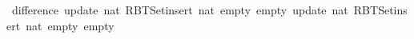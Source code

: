 \begin{isabellebody}
\isamarkupfalse%
\ {\isachardoublequoteopen}difference\ {\isacharparenleft}{\kern0pt}update\ {\isacharparenleft}{\kern0pt}{}{\isacharcolon}{\kern0pt}{\isacharcolon}{\kern0pt}nat{\isacharparenright}{\kern0pt}\ {\isacharparenleft}{\kern0pt}RBT{\isacharunderscore}{\kern0pt}Set{\isachardot}{\kern0pt}insert\ {\isacharparenleft}{\kern0pt}{}{\isacharcolon}{\kern0pt}{\isacharcolon}{\kern0pt}nat{\isacharparenright}{\kern0pt}\ empty{\isacharparenright}{\kern0pt}\ empty{\isacharparenright}{\kern0pt}\ {\isacharparenleft}{\kern0pt}update\ {\isacharparenleft}{\kern0pt}{}{\isacharcolon}{\kern0pt}{\isacharcolon}{\kern0pt}nat{\isacharparenright}{\kern0pt}\ {\isacharparenleft}{\kern0pt}RBT{\isacharunderscore}{\kern0pt}Set{\isachardot}{\kern0pt}insert\ {\isacharparenleft}{\kern0pt}{}{\isacharcolon}{\kern0pt}{\isacharcolon}{\kern0pt}nat{\isacharparenright}{\kern0pt}\ empty{\isacharparenright}{\kern0pt}\ empty{\isacharparenright}{\kern0pt}{\isachardoublequoteclose}%
\endisataginvisible
{\isafoldinvisible}%
%
\isadeliminvisible
\isanewline
%
\endisadeliminvisible
%
\isadelimtheory
\isanewline
%
\endisadelimtheory
%
\isatagtheory
{}\isamarkupfalse%
%
\endisatagtheory
{\isafoldtheory}%
%
\isadelimtheory
%
\endisadelimtheory
%
\end{isabellebody}%
\endinput
